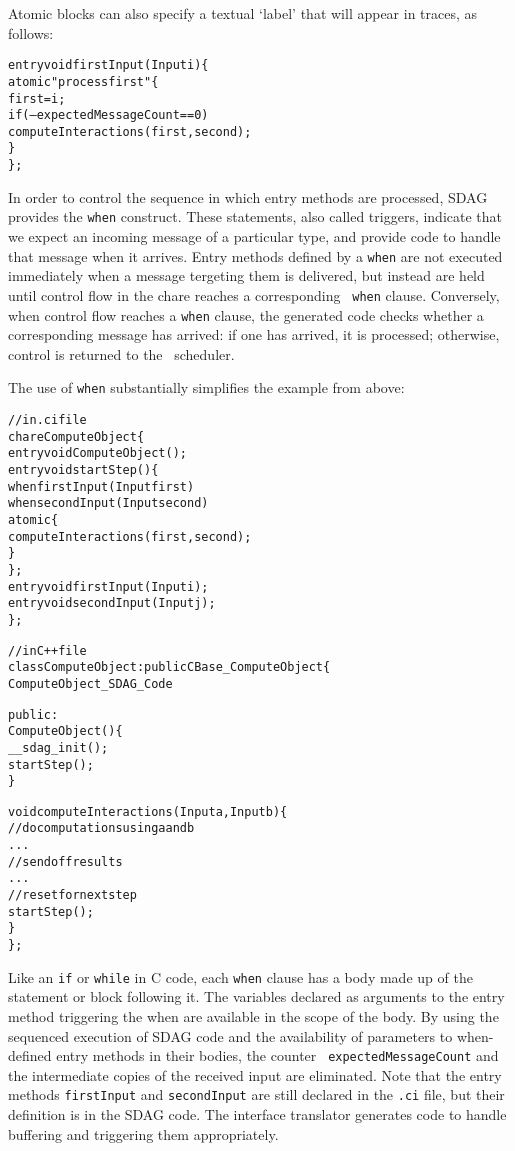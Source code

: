 Atomic blocks can also specify a textual `label' that will appear in traces, as
follows:
\begin{center}
\begin{alltt}
  entry void firstInput(Input i) \{
    atomic "process first" \{
      first = i;
      if (--expectedMessageCount == 0)
        computeInteractions(first, second);
    \}
  \};
\end{alltt}
\end{center}

In order to control the sequence in which entry methods are processed, SDAG
provides the {\tt when} construct. These statements, also called triggers,
indicate that we expect an incoming message of a particular type, and provide
code to handle that message when it arrives.
Entry methods defined by a {\tt when} are
not executed immediately when a message tergeting them is delivered, but
instead are held until control flow in the chare reaches a corresponding {\tt
  when} clause. Conversely, when control flow reaches a {\tt when} clause, the
generated code checks whether a corresponding message has arrived: if one has
arrived, it is processed; otherwise, control is returned to the
\charmpp\ scheduler. 

The use of {\tt when} substantially simplifies the example from above:
\begin{center}
\begin{alltt}
// in .ci file
chare ComputeObject \{
  entry void ComputeObject();
  entry void startStep() \{
    when firstInput(Input first)
      when secondInput(Input second)
        atomic \{
          computeInteractions(first, second);
        \}
  \};
  entry void firstInput(Input i);
  entry void secondInput(Input j);
\};

// in C++ file
class ComputeObject : public CBase_ComputeObject \{
  ComputeObject_SDAG_Code

public:
  ComputeObject() \{
    __sdag_init();
    startStep();
  \}

  void computeInteractions(Input a, Input b) \{
    // do computations using a and b
    . . .
    // send off results
    . . .
    // reset for next step
    startStep();
  \}
\};
\end{alltt}
\end{center}
Like an {\tt if} or {\tt while} in C code, each {\tt when} clause has a body
made up of the statement or block following it. The variables declared as
arguments to the entry method triggering the when are available in the scope of
the body. By using the sequenced execution of SDAG code and the availability of
parameters to when-defined entry methods in their bodies, the counter {\tt
  expectedMessageCount} and the intermediate copies of the received input are
eliminated. Note that the entry methods {\tt firstInput} and {\tt secondInput}
are still declared in the {\tt .ci} file, but their definition is in the SDAG
code. The interface translator generates code to handle buffering and
triggering them appropriately.

